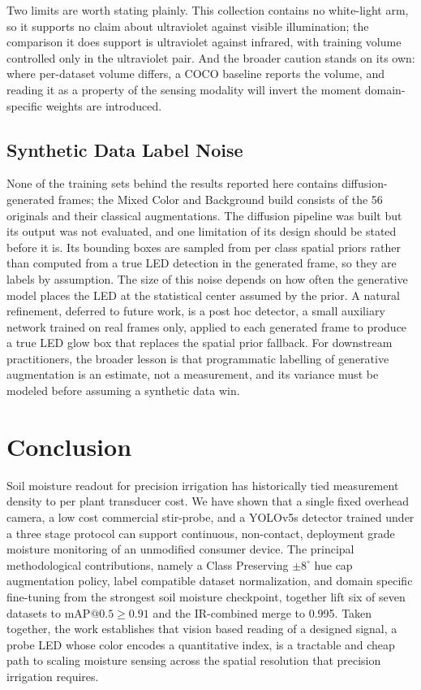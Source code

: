 ﻿\documentclass[journal]{IEEEtran}
\begin{document}
Two limits are worth stating plainly. This collection contains no white-light arm, so it supports no claim about ultraviolet against visible illumination; the comparison it does support is ultraviolet against infrared, with training volume controlled only in the ultraviolet pair. And the broader caution stands on its own: where per-dataset volume differs, a COCO baseline reports the volume, and reading it as a property of the sensing modality will invert the moment domain-specific weights are introduced.

\subsection{Synthetic Data Label Noise}
None of the training sets behind the results reported here contains diffusion-generated frames; the Mixed Color and Background build consists of the 56 originals and their classical augmentations. The diffusion pipeline was built but its output was not evaluated, and one limitation of its design should be stated before it is. Its bounding boxes are sampled from per class spatial priors rather than computed from a true LED detection in the generated frame, so they are labels by assumption. The size of this noise depends on how often the generative model places the LED at the statistical center assumed by the prior. A natural refinement, deferred to future work, is a post hoc detector, a small auxiliary network trained on real frames only, applied to each generated frame to produce a true LED glow box that replaces the spatial prior fallback. For downstream practitioners, the broader lesson is that programmatic labelling of generative augmentation is an estimate, not a measurement, and its variance must be modeled before assuming a synthetic data win.

\section{Conclusion}
\label{sec:conclusion}
Soil moisture readout for precision irrigation has historically tied measurement density to per plant transducer cost. We have shown that a single fixed overhead camera, a low cost commercial stir-probe, and a YOLOv5s detector trained under a three stage protocol can support continuous, non-contact, deployment grade moisture monitoring of an unmodified consumer device. The principal methodological contributions, namely a Class Preserving $\pm 8^{\circ}$ hue cap augmentation policy, label compatible dataset normalization, and domain specific fine-tuning from the strongest soil moisture checkpoint, together lift six of seven datasets to $\text{mAP@0.5} \geq 0.91$ and the IR-combined merge to 0.995. Taken together, the work establishes that vision based reading of a designed signal, a probe LED whose color encodes a quantitative index, is a tractable and cheap path to scaling moisture sensing across the spatial resolution that precision irrigation requires.



\end{document}
